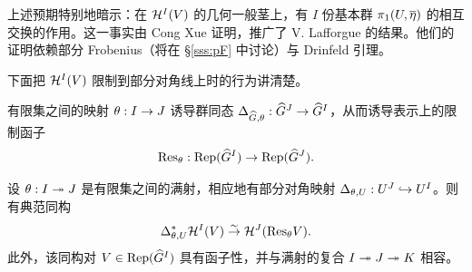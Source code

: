 上述预期特别地暗示：在 $\mathcal{H}^{I}(V)$ 的几何一般茎上，有 $I$ 份基本群 $\pi_{1}(U,\overline {\eta})$ 的相互交换的作用。这一事实由 Cong Xue \cite{X} 证明，推广了 V. Lafforgue \cite{VLaff} 的结果。他们的证明依赖部分 Frobenius（将在 \S\ref{sss:pF} 中讨论）与 Drinfeld 引理。

下面把 $\mathcal{H}^{I}(V)$ 限制到部分对角线上时的行为讲清楚。

有限集之间的映射 $\theta: I\to J$ 诱导群同态 $\Delta_{\widehat{G}, \theta}: \widehat{G}^{J}\to \widehat{G}^{I}$，从而诱导表示上的限制函子
\begin{equation*}
\textup{Res}_{\theta}: \textup{Rep}(\widehat{G}^{I})\to \textup{Rep}(\widehat{G}^{J}).
\end{equation*}

\begin{prop}
设 $\theta: I\twoheadrightarrow J$ 是有限集之间的满射，相应地有部分对角映射 $\Delta_{\theta,U}: U^{J}\hookrightarrow U^{I}$。则有典范同构
\begin{equation*}
\Delta_{\theta,U}^{*}\mathcal{H}^{I}(V)\stackrel{\sim}{\to} \mathcal{H}^{J}(\textup{Res}_{\theta}V).
\end{equation*}
此外，该同构对 $V\in \textup{Rep}(\widehat{G}^{I})$ 具有函子性，并与满射的复合 $I\twoheadrightarrow J\twoheadrightarrow K$ 相容。
\end{prop}
